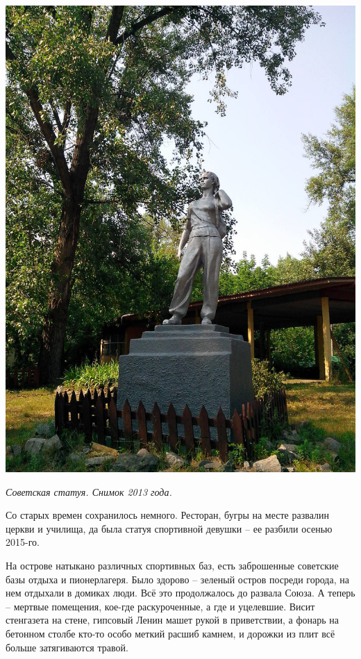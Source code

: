 \begin{center}
\includegraphics[width=\linewidth]{chast-gorodki/cherto/s_tru_IMG_20130628_162249.jpg}

\textit{Советская статуя. Снимок 2013 года.}
\end{center}

Со старых времен сохранилось немного. Ресторан, бугры на месте развалин церкви и училища, да была статуя спортивной девушки – ее разбили осенью 2015-го.

На острове натыкано различных спортивных баз, есть заброшенные советские базы отдыха и пионерлагеря. Было здорово – зеленый остров посреди города, на нем отдыхали в домиках люди. Всё это продолжалось до развала Союза. А теперь – мертвые помещения, кое-где раскуроченные, а где и уцелевшие. Висит стенгазета на стене, гипсовый Ленин машет рукой в приветствии, а фонарь на бетонном столбе кто-то особо меткий расшиб камнем, и дорожки из плит всё больше затягиваются травой.


